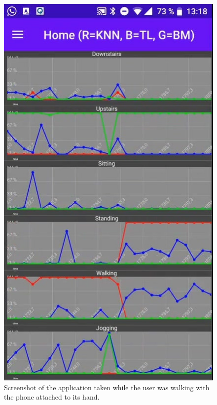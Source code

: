 \begin{figure}[htpb]
\centering
\includegraphics[width=\linewidth]{knn_wrong_screenshot}
\caption{Screenshot of the application taken while the user was walking with the phone attached to its hand.}
\label{myfig:knn_wrong_screenshot}
\end{figure}

